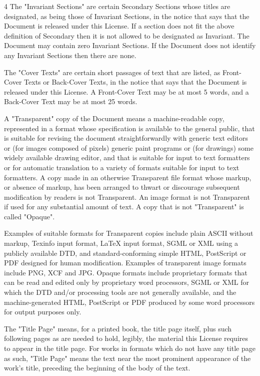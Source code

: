 \documentclass[fontsize=11pt,paper=A4,BCOR=12mm,DIV=13,open=any,listof=totoc,toc=flat]{scrbook}
\begin{document}
{\begin{multicols}{4}
The "Invariant Sections" are certain Secondary Sections whose titles are designated, as being those of Invariant Sections, in the notice that says that the Document is released under this License. If a section does not fit the above definition of Secondary then it is not allowed to be designated as Invariant. The Document may contain zero Invariant Sections. If the Document does not identify any Invariant Sections then there are none.

The "Cover Texts" are certain short passages of text that are listed, as Front-Cover Texts or Back-Cover Texts, in the notice that says that the Document is released under this License. A Front-Cover Text may be at most 5 words, and a Back-Cover Text may be at most 25 words.

A "Transparent" copy of the Document means a machine-readable copy, represented in a format whose specification is available to the general public, that is suitable for revising the document straightforwardly with generic text editors or (for images composed of pixels) generic paint programs or (for drawings) some widely available drawing editor, and that is suitable for input to text formatters or for automatic translation to a variety of formats suitable for input to text formatters. A copy made in an otherwise Transparent file format whose markup, or absence of markup, has been arranged to thwart or discourage subsequent modification by readers is not Transparent. An image format is not Transparent if used for any substantial amount of text. A copy that is not "Transparent" is called "Opaque".

Examples of suitable formats for Transparent copies include plain ASCII without markup, Texinfo input format, LaTeX input format, SGML or XML using a publicly available DTD, and standard-conforming simple HTML, PostScript or PDF designed for human modification. Examples of transparent image formats include PNG, XCF and JPG. Opaque formats include proprietary formats that can be read and edited only by proprietary word processors, SGML or XML for which the DTD and/or processing tools are not generally available, and the machine-generated HTML, PostScript or PDF produced by some word processors for output purposes only.

The "Title Page" means, for a printed book, the title page itself, plus such following pages as are needed to hold, legibly, the material this License requires to appear in the title page. For works in formats which do not have any title page as such, "Title Page" means the text near the most prominent appearance of the work's title, preceding the beginning of the body of the text.


\end{multicols}}
\end{document}
